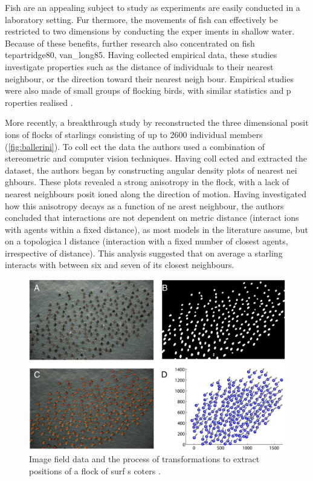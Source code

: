 Fish are an appealing subject to study as experiments are easily conducted in a laboratory setting. Fur
thermore, the movements of fish can effectively be restricted to two dimensions by conducting the exper
iments in shallow water. Because of these benefits, further research also concentrated on fish \parenci
te{partridge80, van_long85}. Having collected empirical data, these studies investigate properties such
 as the distance of individuals to their nearest neighbour, or the direction toward their nearest neigh
bour. Empirical studies were also made of small groups of flocking birds, with similar statistics and p
roperties realised \parencite{major78, budgey98}.

More recently, a breakthrough study by \textcite{ballerini08} reconstructed the three dimensional posit
ions of flocks of starlings consisting of up to 2600 individual members (\cref{fig:ballerini}). To coll
ect the data the authors used a combination of stereometric and computer vision techniques. Having coll
ected and extracted the dataset, the authors began by constructing angular density plots of nearest nei
ghbours. These plots revealed a strong anisotropy in the flock, with a lack of nearest neighbours posit
ioned along the direction of motion. Having investigated how this anisotropy decays as a function of ne
arest neighbour, the authors concluded that interactions are not dependent on metric distance (interact
ions with agents within a fixed distance), as most models in the literature assume, but on a topologica
l distance (interaction with a fixed number of closest agents, irrespective of distance). This analysis
 suggested that on average a starling interacts with between six and seven of its closest neighbours.

\begin{figure}[t]
	\includegraphics[width=\textwidth]{lukeman_data.jpg}
	\caption{Image field data and the process of transformations to extract positions of a flock of surf s
coters \parencite{lukeman10}.}
	\label{fig:lukeman_extraction}
\end{figure}

